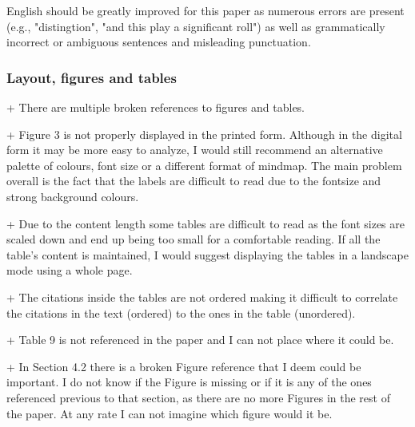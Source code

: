 English should be greatly improved for this paper as numerous errors
are present (e.g., "distingtion", "and this play a significant roll")
as well as grammatically incorrect or ambiguous sentences and
misleading punctuation.



\subsubsection{Layout, figures and tables}

+ There are multiple broken references to figures and tables.


+ Figure 3 is not properly displayed in the printed form. Although in
the digital form it may be more easy to analyze, I would still
recommend an alternative palette of colours, font size or a different
format of mindmap. The main problem overall is the fact that the
labels are difficult to read due to the fontsize and strong background
colours.






+ Due to the content length some tables are difficult to read as the
font sizes are scaled down and end up being too small for a
comfortable reading. If all the table's content is maintained, I would
suggest displaying the tables in a landscape mode using a whole page.


+ The citations inside the tables are not ordered making it difficult
to correlate the citations in the text (ordered) to the ones in the
table (unordered).


+ Table 9 is not referenced in the paper and I can not place where it
could be.


+ In Section 4.2 there is a broken Figure reference that I deem could
be important. I do not know if the Figure is missing or if it is any
of the ones referenced previous to that section, as there are no more
Figures in the rest of the paper. At any rate I can not imagine which
figure would it be.


